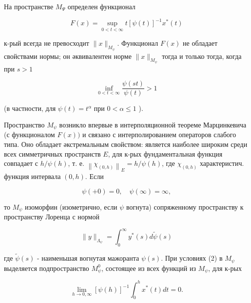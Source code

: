 \documentclass[10pt]{article}
\begin{document}
На пространстве $M_{\Psi}$ определен функционал



\[

F(x)=\sup _{0<t<\infty} t[\psi(t)]^{-1} x^{*}(t)

\]



к-рый всегда не превосходит $\|x\|_{M_{\psi}}$. Функционал $F(x)$ не обладает свойствами нормы; он әквивалентен норме $\|x\|_{M_{\psi}}$ тогда и только тогда, когда при $s>1$



\[

\inf _{0<t<\infty} \frac{\psi(s t)}{\psi(t)}>1

\]



(в частности, для $\psi(t)=t^{\alpha}$ при $0<\alpha \leqslant 1$ ).



Пространство $M_{\psi}$ возникло впервые в интерполяционной теореме Марцинкевича (с функционалом $F(x))$ и связано с интерполированием операторов слабого типа. Оно обладает әкстремальным свойством: является наиболее широким среди всех симметричных пространств $E$, для к-рых фундаментальная функция совпадает с $h / \psi(h)$, т. е. $\left\|\chi_{(0, h)}\right\|_{E}=h / \psi(h)$, где $\chi_{(0, h)}$ характеристич. функция интервала $(0, h)$. Если



\[

\psi(+0)=0, \quad \psi(\infty)=\infty,

\]



то $M_{\psi}$ изоморфин (изометрично, если $\psi$ вогнута) сопряженному пространству к пространству Лоренца с нормой



\[

\|y\|_{\Lambda_{\psi}}=\int_{0}^{\infty} y^{*}(s) d \tilde{\psi}(s)

\]



где $\tilde{\psi}(s)$ - наименьшая вогнутая мажоранта $\psi(s)$. При условиях (2) в $M_{\psi}$ выделяется подпространство $M_{\psi}^{0}$, состоящее из всех функций из $M_{\psi}$, для к-рых



\[

\lim _{h \rightarrow 0, \infty}[\psi(h)]^{-1} \int_{0}^{h} x^{*}(t) d t=0 .

\]
\end{document}
